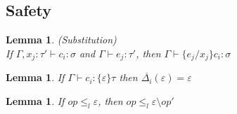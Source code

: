 \documentclass{article}
\newtheorem{lemma}[theorem]{Lemma}
\theoremstyle{definition}
\begin{document}
\subsection{Safety}

\begin{lemma} (Substitution) \\
If $\Gamma, x_j : \tau' \vdash c_i : \sigma$ and $\Gamma \vdash e_j : \tau'$, then $\Gamma \vdash \{e_j/x_j\}c_i : \sigma$
\end{lemma}

\begin{lemma} 
\label{lemma-exact}
If $\Gamma \vdash c_i : \{\varepsilon\}\tau$ then $\overline{\Delta_i}(\varepsilon) = \varepsilon$
\end{lemma}

\begin{lemma}
\label{lemma-relation}
If $op \leq_{l} \varepsilon$, then $op \leq_{l} \varepsilon \setminus op'$
\end{lemma}
\end{document}
